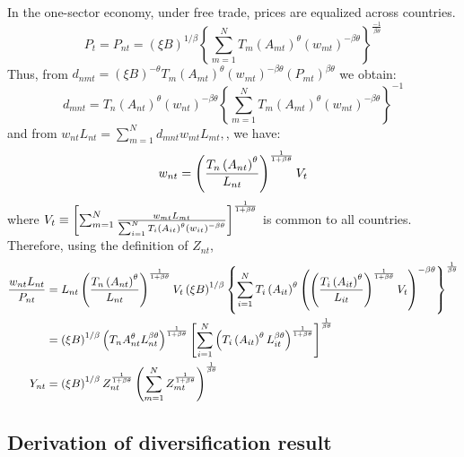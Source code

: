 \documentclass[12pt]{article}
\begin{document}
In the one-sector economy, under free trade, prices are equalized across
countries. 
\begin{equation}
P_{t}=P_{nt}=\left( \xi B\right) ^{1/\beta }\left\{
\sum_{m=1}^{N}T_{m}\left( A_{mt}\right) ^{\theta }\left( w_{mt}\right)
^{-\beta \theta }\right\} ^{\frac{-1}{\beta \theta }}
\end{equation}%
Thus, from $d_{nmt}=\left( \xi B\right) ^{-\theta }T_{m}\left( A_{mt}\right)
^{\theta }\left( w_{mt}\right) ^{-\beta \theta }\left( P_{mt}\right) ^{\beta
\theta }$ we obtain: 
\begin{equation}
d_{mnt}=T_{n}\left( A_{nt}\right) ^{\theta }\left( w_{nt}\right) ^{-\beta
\theta }\left\{ \sum_{m=1}^{N}T_{m}\left( A_{mt}\right) ^{\theta }\left(
w_{mt}\right) ^{-\beta \theta }\right\} ^{-1}
\end{equation}%
and from $w_{nt}L_{nt}=\sum\nolimits_{m=1}^{N}d_{mnt}w_{mt}L_{mt},$, we
have: 
\begin{equation}
w_{nt}=\left( \frac{T_{n}\left( A_{nt}\right) ^{\theta }}{L_{nt}}\right) ^{%
\frac{1}{1+\beta \theta }}V_{t}
\end{equation}%
where $V_{t}\equiv \left[ \sum\nolimits_{m=1}^{N}\frac{w_{mt}L_{mt}}{%
\sum_{i=1}^{N}T_{i}\left( A_{it}\right) ^{\theta }\left( w_{it}\right)
^{-\beta \theta }}\right] ^{\frac{1}{1+\beta \theta }}$ is common to all
countries. Therefore, using the definition of $Z_{nt}$, 
\begin{align*}
\frac{w_{nt}L_{nt}}{P_{nt}}& =L_{nt}\left( \frac{T_{n}\left( A_{nt}\right)
^{\theta }}{L_{nt}}\right) ^{\frac{1}{1+\beta \theta }}V_{t}\left( \xi
B\right) ^{1/\beta }\left\{ \sum_{i=1}^{N}T_{i}\left( A_{it}\right) ^{\theta
}\left( \left( \frac{T_{i}\left( A_{it}\right) ^{\theta }}{L_{it}}\right) ^{%
\frac{1}{1+\beta \theta }}V_{t}\right) ^{-\beta \theta }\right\} ^{\frac{1}{%
\beta \theta }} \\
& =\left( \xi B\right) ^{1/\beta }\left( T_{n}A_{nt}^{\theta }L_{nt}^{\beta
\theta }\right) ^{\frac{1}{1+\beta \theta }}\left[ \sum_{i=1}^{N}\left(
T_{i}\left( A_{it}\right) ^{\theta }L_{it}^{\beta \theta }\right) ^{\frac{1}{%
1+\beta \theta }}\right] ^{\frac{1}{\beta \theta }} \\
Y_{nt}& =\left( \xi B\right) ^{1/\beta }Z_{nt}^{\frac{1}{1+\beta \theta }%
}\left( \sum_{m=1}^{N}Z_{mt}^{\frac{1}{1+\beta \theta }}\right) ^{\frac{1}{%
\beta \theta }}
\end{align*}

\subsection{Derivation of diversification result}
\end{document}
